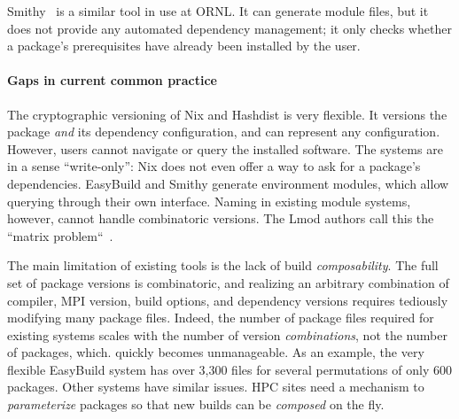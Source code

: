 Smithy~\cite{digirolamo:smithy} is a similar tool in use at ORNL. It
can generate module files, but it does not provide any 
automated dependency management; it only checks whether a package's
prerequisites have already been installed by the user.

\paragraph{Gaps in current common practice}
The cryptographic versioning of Nix and Hashdist is very flexible. It versions
the package {\it and} its dependency configuration, and can represent any
configuration. However, users cannot navigate or query the installed software.
The systems are in a sense ``write-only'':
Nix does not even offer a way to ask for a package's dependencies.
%
EasyBuild and Smithy generate environment modules, which allow querying
through their own interface. Naming in existing module systems, however, cannot
handle combinatoric versions. The Lmod authors call this the
``matrix problem``~\cite{mclay:lmod-tutorial}.



The main limitation of existing tools is the lack of build {\it composability}.
The full set of package versions is combinatoric, and realizing an arbitrary
combination of compiler, MPI version, build options, and dependency versions
requires tediously modifying many package files.
%
Indeed, the number of package files required for existing systems scales with
the number of version {\it combinations}, not the number of packages, which.
quickly becomes unmanageable.  As an example, the very flexible EasyBuild
system has over 3,300 files for several permutations of only 600 packages. 
Other systems have similar issues. HPC sites need a mechanism to 
{\it parameterize} packages so that new builds can be {\it composed} on the fly.












